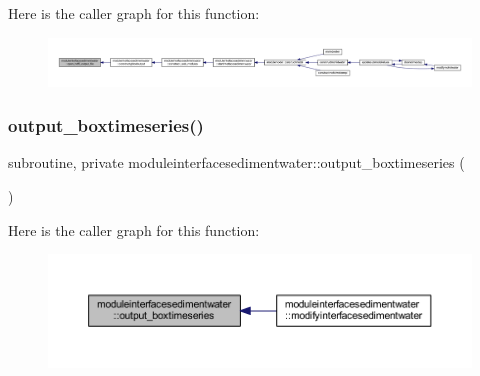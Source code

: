Here is the caller graph for this function\+:\nopagebreak
\begin{figure}[H]
\begin{center}
\leavevmode
\includegraphics[width=350pt]{namespacemoduleinterfacesedimentwater_a4426ad3ca86030e07e39188a538bdca8_icgraph}
\end{center}
\end{figure}
\mbox{\label{namespacemoduleinterfacesedimentwater_ae4c4f73744fd3c2e241e675f6fc1d839}} 
\subsubsection{\texorpdfstring{output\+\_\+boxtimeseries()}{output\_boxtimeseries()}}
{\footnotesize\ttfamily subroutine, private moduleinterfacesedimentwater\+::output\+\_\+boxtimeseries (\begin{DoxyParamCaption}{ }\end{DoxyParamCaption})\hspace{0.3cm}{\ttfamily [private]}}

Here is the caller graph for this function\+:\nopagebreak
\begin{figure}[H]
\begin{center}
\leavevmode
\includegraphics[width=350pt]{namespacemoduleinterfacesedimentwater_ae4c4f73744fd3c2e241e675f6fc1d839_icgraph}
\end{center}
\end{figure}
\mbox{\label{namespacemoduleinterfacesedimentwater_ab623073c171ba3d532b1c1ec393f91b6}} 
